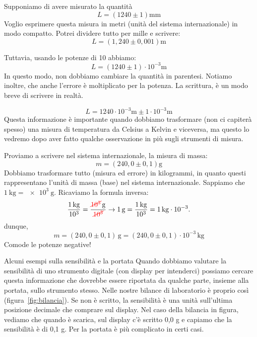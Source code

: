 \documentclass[12pt,a4paper,oneside]{book}
\makeatletter
\newcounter{testexample} %
\renewcommand{\section}{\@startsection{section}{1}{\z@}
{-4ex \@plus -1ex \@minus -.4ex}
{1ex \@plus.2ex }
{\normalfont\large\sffamily\bfseries}}
\theoremstyle{esercizio}
\makeatother
\begin{document}
\begin{testexample}
Supponiamo di avere misurato la quantità
\[
L=\left(1240\pm1\right)\si{\milli\meter}
\]
Voglio esprimere questa misura in metri (unità del sistema internazionale) in modo compatto. Potrei dividere tutto per mille e scrivere:
\[
L=\left(1,240\pm 0,001\right)\si{\meter}
\]

Tuttavia, usando le potenze di 10 abbiamo:
\[
L=\left(1240\pm 1\right)\cdot 10^{-3}\si{\meter}
\]
In questo modo, non dobbiamo cambiare la quantità in parentesi. Notiamo inoltre, che anche l'errore è moltiplicato per la potenza. La scrittura, è un modo breve di scrivere in realtà.

\[
L= 1240\cdot 10^{-3}\si{\meter} \pm 1\cdot 10^{-3}\si{\meter}
\]
Questa informazione è importante quando dobbiamo trasformare (non ci capiterà spesso) una misura di temperatura da Celsius a Kelvin e viceversa, ma questo lo vedremo dopo aver fatto qualche osservazione in più sugli strumenti di misura.

Proviamo a scrivere nel sistema internazionale, la misura di massa:
\[
m=\left(240,0\pm 0,1\right)\si{\gram}
\]
Dobbiamo trasformare tutto (misura ed errore) in kilogrammi, in quanto questi rappresentano l'unità di massa (base) nel sistema internazionale. Sappiamo che $\SI{1}{\kilo\gram}=\SI{e3}{\gram}$. Ricaviamo la formula inversa:
\[
\frac{\SI{1}{\kilo\gram}}{10^3} = \frac{\textcolor{red}{\cancel{10^3}}\,\si{\gram}}{\textcolor{red}{\cancel{10^3}}} \rightarrow \SI{1}{\gram} = \frac{\SI{1}{\kilo\gram}}{10^3} = \SI{1}{\kilo\gram}\cdot 10^{-3}. 
\]
dunque,
\[
m=\left(240,0\pm 0,1\right)\,\si{\gram} = \left(240,0\pm 0,1\right)\cdot 10^{-3}\,\si{\kilo\gram}
\]
Comode le potenze negative!


\end{testexample}

\section{Alcuni esempi sulla sensibilità e la portata}
Quando dobbiamo valutare la sensibilità di uno strumento digitale (con display per intenderci) possiamo cercare questa informazione che dovrebbe essere riportata da qualche parte, insieme alla portata, sullo strumento stesso. Nelle nostre bilance di laboratorio è proprio così (figura~\ref{fig:bilancia}). Se non è scritto, la sensibilità è una unità sull'ultima posizione decimale che comprare sul display. Nel caso della bilancia in figura, vediamo che quando è scarica, sul display c'è scritto 0,0 g e capiamo che la sensibilità è di 0,1 g. Per la portata è più complicato in certi casi. 
\end{document}

